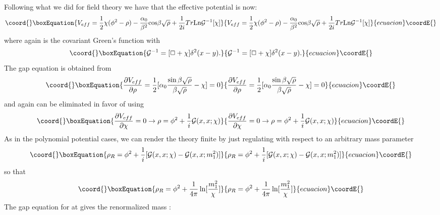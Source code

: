 \documentclass[a4paper,prd,preprint,superscriptaddress,showpacs,byrevtex]{revtex4}
\begin{document}
Following what we did for \coordHE{} field theory we have that the effective
potential is now:
\begin{equation}\coord{}\boxEquation{
V_{eff} =  \frac{1}{2} \chi( \phi^2 - \rho)  -\frac{\alpha_0}{\beta^2} {\rm
cos} \beta \sqrt{\rho}+ \frac{1}{2i} Tr {\rm Ln} {\cal G}^{-1}[\chi]
}{
V_{eff} =  \frac{1}{2} \chi( \phi^2 - \rho)  -\frac{\alpha_0}{\beta^2} {\rm
cos} \beta \sqrt{\rho}+ \frac{1}{2i} Tr {\rm Ln} {\cal G}^{-1}[\chi]
}{ecuacion}\coordE{}\end{equation}
where again  \coordHE{} is the covariant Green's function with
\begin{equation}\coord{}\boxEquation{
{\cal G} ^{-1}= [\Box + \chi] \delta^2 (x-y).
}{
{\cal G} ^{-1}= [\Box + \chi] \delta^2 (x-y).
}{ecuacion}\coordE{}\end{equation}
The gap equation  is obtained from
\begin{equation}\coord{}\boxEquation{
\frac{\partial V_{eff}}{\partial \rho} = \frac{1}{2} [\alpha_0 \frac {\sin \beta
\sqrt{\rho}} {\beta \sqrt{\rho}} -
\chi]= 0
}{
\frac{\partial V_{eff}}{\partial \rho} = \frac{1}{2} [\alpha_0 \frac {\sin \beta
\sqrt{\rho}} {\beta \sqrt{\rho}} -
\chi]= 0
}{ecuacion}\coordE{}\end{equation}
and \myHighlight{$\rho$}\coordHE{} again can be eliminated in favor of \myHighlight{$\chi$}\coordHE{} using
\begin{equation}\coord{}\boxEquation{
\frac{\partial V_{eff}}{\partial \chi} =0 \rightarrow \rho=\phi^2 + \frac{1}{i}
{\cal G}(x,x;\chi) }{
\frac{\partial V_{eff}}{\partial \chi} =0 \rightarrow \rho=\phi^2 + \frac{1}{i}
{\cal G}(x,x;\chi) }{ecuacion}\coordE{}\end{equation}
As in the polynomial potential cases, we can render the theory finite by
just
regulating \myHighlight{$\rho$}\coordHE{} with respect to an arbitrary mass parameter \coordHE{}
\begin{equation}\coord{}\boxEquation{ \rho_R=\phi^2 + \frac{1}{i} [{\cal G} (x,x;\chi)-
{\cal G(} x,x;m_1^2)] }{ \rho_R=\phi^2 + \frac{1}{i} [{\cal G} (x,x;\chi)-
{\cal G(} x,x;m_1^2)] }{ecuacion}\coordE{}\end{equation}
so that
\begin{equation}\coord{}\boxEquation{
\rho_R = \phi^2 + \frac{1}{4 \pi} \ln[\frac{m_1^2}{\chi}]
}{
\rho_R = \phi^2 + \frac{1}{4 \pi} \ln[\frac{m_1^2}{\chi}]
}{ecuacion}\coordE{}\end{equation}
The gap equation for \myHighlight{$\chi$}\coordHE{} at \coordHE{} gives the renormalized mass \coordHE{}:
\end{document}
